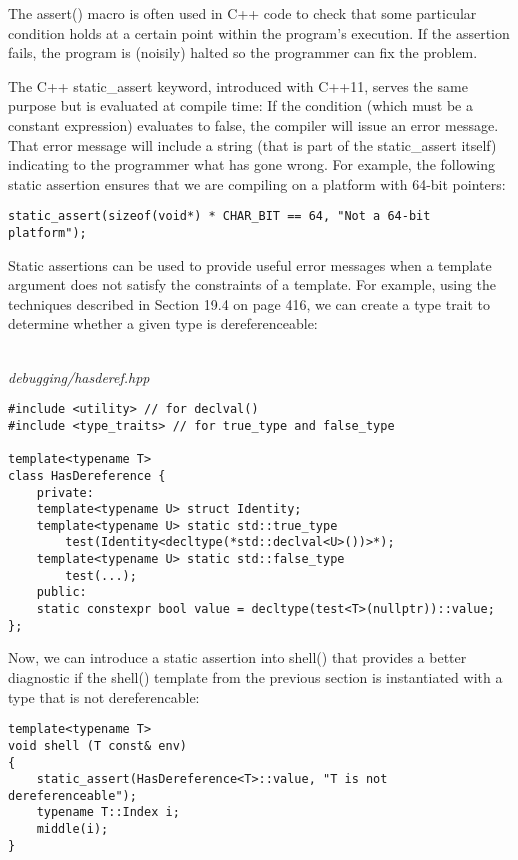 The assert() macro is often used in C++ code to check that some particular condition holds at a certain point within the program’s execution. If the assertion fails, the program is (noisily) halted so the programmer can fix the problem.

The C++ static\_assert keyword, introduced with C++11, serves the same purpose but is evaluated at compile time: If the condition (which must be a constant expression) evaluates to false, the compiler will issue an error message. That error message will include a string (that is part of the static\_assert itself) indicating to the programmer what has gone wrong. For example, the following static assertion ensures that we are compiling on a platform with 64-bit pointers:

\begin{lstlisting}[style=styleCXX]
static_assert(sizeof(void*) * CHAR_BIT == 64, "Not a 64-bit platform");
\end{lstlisting}

Static assertions can be used to provide useful error messages when a template argument does not satisfy the constraints of a template. For example, using the techniques described in Section 19.4 on page 416, we can create a type trait to determine whether a given type is dereferenceable:

\hspace*{\fill} \\ %
\noindent
\textit{debugging/hasderef.hpp}
\begin{lstlisting}[style=styleCXX]
#include <utility> // for declval()
#include <type_traits> // for true_type and false_type

template<typename T>
class HasDereference {
	private:
	template<typename U> struct Identity;
	template<typename U> static std::true_type
		test(Identity<decltype(*std::declval<U>())>*);
	template<typename U> static std::false_type
		test(...);
	public:
	static constexpr bool value = decltype(test<T>(nullptr))::value;
};
\end{lstlisting}

Now, we can introduce a static assertion into shell() that provides a better diagnostic if the shell() template from the previous section is instantiated with a type that is not dereferencable:

\begin{lstlisting}[style=styleCXX]
template<typename T>
void shell (T const& env)
{
	static_assert(HasDereference<T>::value, "T is not dereferenceable");
	typename T::Index i;
	middle(i);
}
\end{lstlisting}

